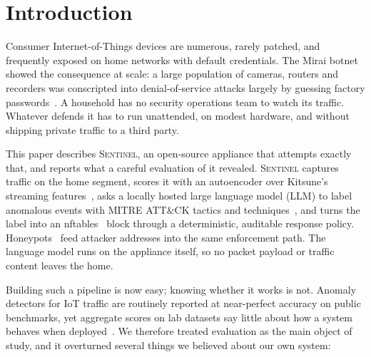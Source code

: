 \section{Introduction}
\label{sec:intro}

Consumer Internet-of-Things devices are numerous, rarely patched, and
frequently exposed on home networks with default credentials. The Mirai botnet
showed the consequence at scale: a large population of cameras, routers and
recorders was conscripted into denial-of-service attacks largely by guessing
factory passwords~\cite{antonakakis2017mirai}. A household has no security
operations team to watch its traffic. Whatever defends it has to run
unattended, on modest hardware, and without shipping private traffic to a
third party.

This paper describes \textsc{Sentinel}, an open-source appliance that attempts
exactly that, and reports what a careful evaluation of it revealed.
\textsc{Sentinel} captures traffic on the home segment, scores it with an
autoencoder over Kitsune's streaming features~\cite{mirsky2018kitsune}, asks a
locally hosted large language model (LLM) to label anomalous events with MITRE
ATT\&CK tactics and techniques~\cite{mitreattack}, and turns the label into an
nftables~\cite{nftables} block through a deterministic, auditable response
policy. Honeypots~\cite{cowrie,opencanary} feed attacker addresses into the
same enforcement path. The language model runs on the appliance itself, so no
packet payload or traffic content leaves the home.

Building such a pipeline is now easy; knowing whether it works is not. Anomaly
detectors for IoT traffic are routinely reported at near-perfect accuracy on
public benchmarks, yet aggregate scores on lab datasets say little about how a
system behaves when deployed~\cite{sommer2010closedworld,arp2022dosdonts}. We
therefore treated evaluation as the main object of study, and it overturned
several things we believed about our own system:

